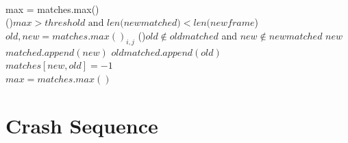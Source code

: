 \documentclass[11pt,twoside]{report}
\begin{document}
\texttt{\\}
max = matches.max() \texttt{\\}
\While(){$max > threshold \text{ and } len(new$\textunderscore$matched)<len(new$\textunderscore$frame$)}{
	$old,new = matches.max()_{i,j}$ 
	\uIf(){$old \notin old$\textunderscore$matched$ and $new \notin new$\textunderscore$matched$}{
		$new$\textunderscore$matched.append(new)$ 
		$old$\textunderscore$matched.append(old)$ 
	}
	\texttt{\\}
	$matches[new,old] = -1$ \texttt{\\}
	$max = matches.max()$
}

\newpage
\section{Crash Sequence} \label{append_cr_seq}
\end{document}
